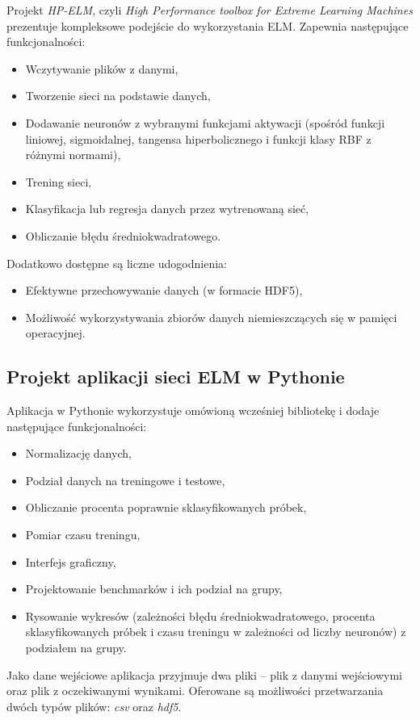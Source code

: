 \documentclass{article}
\begin{document}
Projekt \textit{HP-ELM}, czyli \textit{High Performance toolbox for Extreme Learning Machines} prezentuje kompleksowe podejście do wykorzystania ELM. Zapewnia następujące funkcjonalności:
\begin{itemize}
\item Wczytywanie plików z danymi,
\item Tworzenie sieci na podstawie danych,
\item Dodawanie neuronów z wybranymi funkcjami aktywacji (spośród funkcji liniowej, sigmoidalnej, tangensa hiperbolicznego i funkcji klasy RBF z różnymi normami),
\item Trening sieci,
\item Klasyfikacja lub regresja danych przez wytrenowaną sieć,
\item Obliczanie błędu średniokwadratowego.
\end{itemize}
Dodatkowo dostępne są liczne udogodnienia:
\begin{itemize}
\item Efektywne przechowywanie danych (w formacie HDF5),
\item Możliwość wykorzystywania zbiorów danych niemieszczących się w pamięci operacyjnej.
\end{itemize}
\subsection{Projekt aplikacji sieci ELM w Pythonie}
Aplikacja w Pythonie wykorzystuje omówioną wcześniej bibliotekę i dodaje następujące funkcjonalności:
\begin{itemize}
\item Normalizację danych,
\item Podział danych na treningowe i testowe,
\item Obliczanie procenta poprawnie sklasyfikowanych próbek,
\item Pomiar czasu treningu,
\item Interfejs graficzny,
\item Projektowanie benchmarków i ich podział na grupy,
\item Rysowanie wykresów (zależności błędu średniokwadratowego, procenta sklasyfikowanych próbek i czasu treningu w zależności od liczby neuronów) z podziałem na grupy.
\end{itemize}
Jako dane wejściowe aplikacja przyjmuje dwa pliki -- plik z danymi wejściowymi oraz plik z oczekiwanymi wynikami. Oferowane są możliwości przetwarzania dwóch typów plików: \textit{csv} oraz \textit{hdf5}. 
\end{document}
